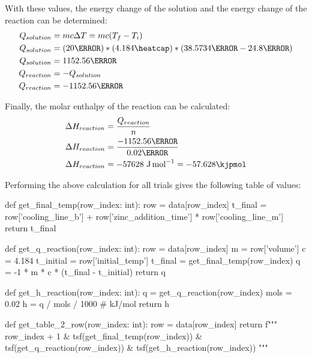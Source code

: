 \documentclass[demo, 12pt, notitlepage, letterpaper]{report}
\begin{document}
With these values, the energy change of the solution and the energy change of the reaction can be determined:
\begin{align*}
	Q_{solution} & = mc\Delta T = mc(T_f - T_i)
	\\
	Q_{solution} & = (20\gram) * (4.184\heatcap) * (38.5734\celsius - 24.8\celsius)
	\\
	Q_{solution} & = 1152.56\joule
	\\
	Q_{reaction} & = -Q_{solution}
	\\
	Q_{reaction} & = -1152.56\joule
\end{align*}

Finally, the molar enthalpy of the reaction can be calculated:
\begin{align*}
	\Delta H_{reaction} & = \frac{Q_{reaction}}{n}                        \\
	\Delta H_{reaction} & = \frac{-1152.56\joule}{0.02\mol}               \\
	\Delta H_{reaction} & = -57628~\unit{\joule\per\mol} = -57.628\kjpmol
\end{align*}

Performing the above calculation for all trials gives the following table of values:

\begin{pycode}
def get_final_temp(row_index: int):
	row = data[row_index]
	t_final = row['cooling_line_b'] + row['zinc_addition_time'] * row['cooling_line_m']
	return t_final

def get_q_reaction(row_index: int):
	row = data[row_index]
	m = row['volume']
	c = 4.184
	t_initial = row['initial_temp']
	t_final = get_final_temp(row_index)
	q = -1 * m * c * (t_final - t_initial)
	return q

def get_h_reaction(row_index: int):
	q = get_q_reaction(row_index)
	mols = 0.02
	h = q / mols / 1000 # kJ/mol
	return h

def get_table_2_row(row_index: int):
	row = data[row_index]
	return f"""
		{row_index + 1}
		& {tsf(get_final_temp(row_index))}
		& {tsf(get_q_reaction(row_index))}
		& {tsf(get_h_reaction(row_index))}
	"""
\end{pycode}
\end{document}
